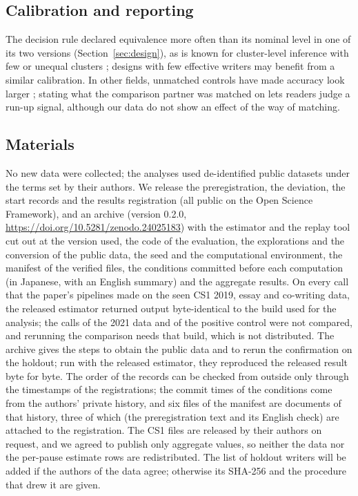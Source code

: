 \subsection{Calibration and reporting}

The decision rule declared equivalence more often than its nominal level in one of its two versions
(Section~\ref{sec:design}), as is known for cluster-level inference with few or unequal clusters
\cite{cameron2008bootstrap,cameron2015practitioner,mackinnon2023cluster}; designs with few effective writers may
benefit from a similar calibration. In other fields, unmatched controls have made accuracy look
larger \cite{lijmer1999empirical,pepe2008pivotal}; stating what the comparison partner was matched on lets readers judge
a run-up signal, although our data do not show an effect of the way of matching.

\subsection{Materials}

No new data were collected; the analyses used de-identified public datasets under the terms set by their authors. We
release the preregistration, the deviation, the start records and the results registration (all public on the Open
Science Framework), and an archive (version 0.2.0, \url{https://doi.org/10.5281/zenodo.24025183}) with the estimator and
the replay tool cut out at the version used, the code of the evaluation, the explorations and the conversion of the
public data, the seed and the computational environment, the manifest of the verified files, the conditions committed
before each computation (in Japanese, with an English summary) and the aggregate results. On every call that the
paper's pipelines made on the seen CS1 2019, essay and co-writing data, the released estimator returned output
byte-identical to the build used for the analysis; the calls of the 2021 data and of the positive control were not
compared, and rerunning the comparison needs that build, which is not distributed. The archive gives the steps to obtain
the public data and to rerun the confirmation on the holdout; run with the released estimator, they reproduced the
released result byte for byte. The order of the records can be checked from outside only
through the timestamps of the registrations; the commit times of the conditions come from the authors' private history,
and six files of the manifest are documents of that history, three of which (the preregistration text and its English
check) are attached to the registration. The CS1 files are released by their authors on request, and we agreed to publish
only aggregate values, so neither the data nor the per-pause estimate rows are redistributed. The list of holdout writers
will be added if the authors of the data agree; otherwise its SHA-256 and the procedure that drew it are given.
